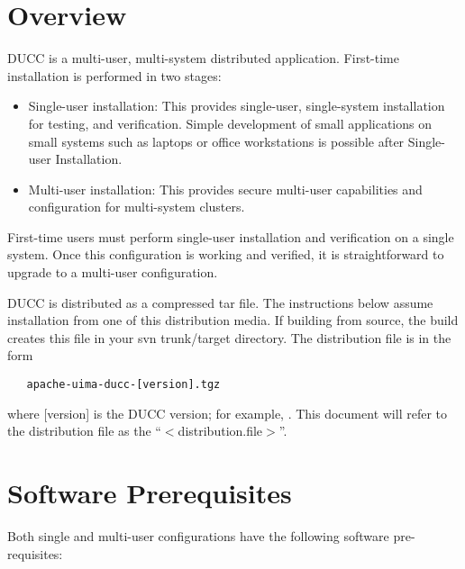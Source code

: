 \section{Overview}

DUCC is a multi-user, multi-system distributed application.  First-time installation is performed in
two stages:

\begin{itemize}
    \item Single-user installation: This provides single-user, single-system installation for testing,
      and verification. Simple development of small applications on small systems such as laptops or
      office workstations is possible after Single-user Installation.
      
    \item Multi-user installation: This provides secure multi-user capabilities and configuration
      for multi-system clusters.
\end{itemize}

First-time users must perform single-user installation and verification on a single system.  Once
this configuration is working and verified, it is straightforward to upgrade to a multi-user
configuration.

DUCC is distributed as a compressed tar file.  The instructions below assume installation from one
of this distribution media.  If building from source, the build creates this file in your svn
trunk/target directory. The distribution file is in the form
\begin{verbatim}
   apache-uima-ducc-[version].tgz
\end{verbatim}
where [version] is the DUCC version; for example, {\em \distro}.  This document will refer to the distribution
file as the ``$<$distribution.file$>$''.

\section{Software Prerequisites}
\label{sec:install.prerequisites}
Both single and multi-user configurations have the following software pre-requisites:

